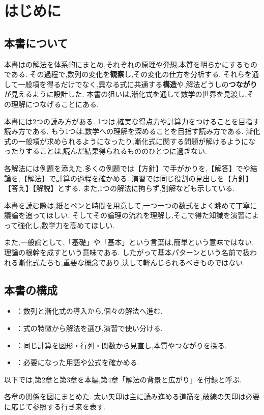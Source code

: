 
\chapter{はじめに}\label{章：はじめに}
\begin{bookcolumns}
  \section{本書について}\label{節：本書について}
  本書はの解法を体系的にまとめ,それぞれの原理や発想,本質を明らかにするものである.
  その過程で,数列の変化を\textbf{観察}し,その変化の仕方を分析する.
  それらを通して一般項を得るだけでなく,異なる式に共通する\textbf{構造}や,解法どうしの\textbf{つながり}が見えるように設計した.
  本書の狙いは,漸化式を通して数学の世界を見渡し,その理解につなげることにある.

  本書には2つの読み方がある.
  1つは,確実な得点力や計算力をつけることを目指す読み方である.
  もう1つは,数学への理解を深めることを目指す読み方である.
  漸化式の一般項が求められるようになったり,漸化式に関する問題が解けるようになったりすることは,読んだ結果得られるもののひとつに過ぎない.

  各解法には例題を添えた.多くの例題では【方針】で手がかりを,【解答】でや結論を,【解法】で計算の過程を確かめる.
  演習では同じ役割の見出しを【方針】【答え】【解説】とする.
  また,1つの解法に拘らず,別解なども示している.
  
  本書を読む際は,紙とペンと時間を用意して,一つ一つの数式をよく眺めて丁寧に議論を追ってほしい.
  そしてその論理の流れを理解し,そこで得た知識を演習によって強化し,数学力を高めてほしい.

  また,一般論として,「基礎」や「基本」という言葉は,簡単という意味ではない.
  理論の根幹を成すという意味である.
  したがって基本パターンという名前で扱われる漸化式たちも,重要な概念であり,決して軽んじられるべきものではない.

  \section{本書の構成}\label{節：本書の構成}
  \begin{itemize}
    \item {}：数列と漸化式の導入から,個々の解法へ進む.
    \item {}：式の特徴から解法を選び,演習で使い分ける.
    \item {}：同じ計算を図形・行列・関数から見直し,本質やつながりを探る.
    \item {}：必要になった用語や公式を確かめる.
  \end{itemize}
  以下では,第2章と第3章を本編,第4章「解法の背景と広がり」を付録と呼ぶ.
  \par\noindent\begin{minipage}{\linewidth}
    各章の関係を図にまとめた.
    太い矢印は主に読み進める道筋を,破線の矢印は必要に応じて参照する行き来を表す.
    \BookFigRoadmap
  \end{minipage}\par


\end{bookcolumns}
